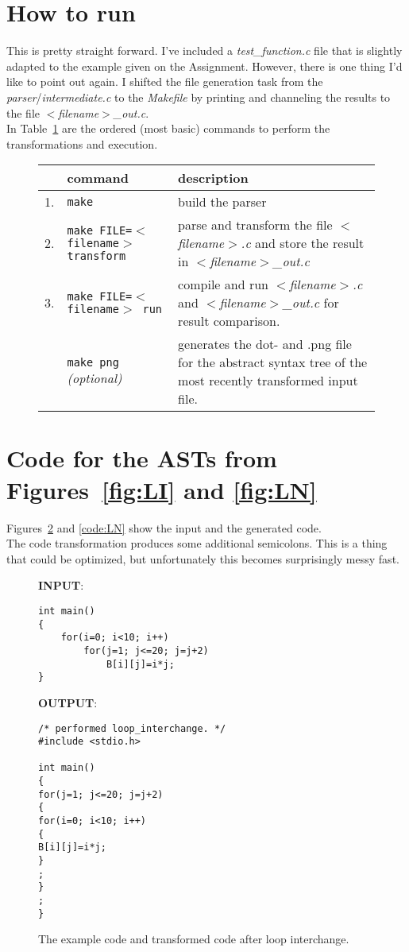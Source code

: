 \documentclass{scrartcl}
\begin{document}
\section{How to run}
This is pretty straight forward. I've included a \textit{test\_function.c} file that is slightly adapted to the example given on the Assignment. However, there is one thing I'd like to point out again. I shifted the file generation task from the \textit{parser}/\textit{intermediate.c} to the \textit{Makefile} by printing and channeling the results to the file \textit{$<$filename$>$\_out.c}. \\
In Table~\ref{tab:commands} are the ordered (most basic) commands to perform the transformations and execution.

\begin{figure}
\centering
\begin{tabular}{|c|l|p{7cm}|}
\hline
 & \textbf{command} & \textbf{description} \\
\hline
\hline
1. & \texttt{make} & build the parser \\
\hline
2. & \texttt{make FILE=$<$filename$>$ transform} & parse and transform the file \textit{$<$filename$>$.c} and store the result in \textit{$<$filename$>$\_out.c}\\
\hline
3. & \texttt{make FILE=$<$filename$>$ run} & compile and run \textit{$<$filename$>$.c} and \textit{$<$filename$>$\_out.c} for result comparison.\\
\hline
 & \texttt{make png} \textit{(optional)} & generates the dot- and .png file for the abstract syntax tree of the most recently transformed input file. \\
\hline
\end{tabular}
\label{tab:commands}
\end{figure}

\section{Code for the ASTs from Figures~\ref{fig:LI} and \ref{fig:LN}}
Figures~\ref{code:LI} and \ref{code:LN} show the input and the generated code.\\
The code transformation produces some additional semicolons. This is a thing that could be optimized, but unfortunately this becomes surprisingly messy fast.

\begin{figure}
\centering
\textbf{INPUT}:
\begin{lstlisting}
int main()
{
	for(i=0; i<10; i++)
		for(j=1; j<=20; j=j+2)
			B[i][j]=i*j;
}
\end{lstlisting}
\textbf{OUTPUT}:
\begin{lstlisting}
/* performed loop_interchange. */
#include <stdio.h>

int main()
{
for(j=1; j<=20; j=j+2)
{
for(i=0; i<10; i++)
{
B[i][j]=i*j;
}
;
}
;
}
\end{lstlisting}
\caption{The example code and transformed code after loop interchange.}
\label{code:LI}
\end{figure}
\end{document}
